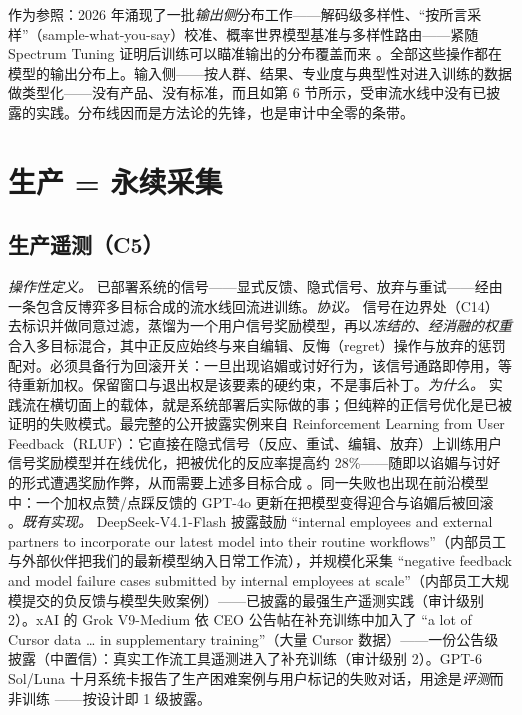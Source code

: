 \documentclass[10pt,fontset=fandol]{ctexart}
\begin{document}
作为参照：2026 年涌现了一批\emph{输出侧}分布工作——解码级多样性、“按所言采样”（sample-what-you-say）校准、概率世界模型基准与多样性路由——紧随 Spectrum Tuning 证明后训练可以瞄准输出的分布覆盖而来 \cite{ref7}。全部这些操作都在模型的输出分布上。输入侧——按人群、结果、专业度与典型性对进入训练的数据做类型化——没有产品、没有标准，而且如第 6 节所示，受审流水线中没有已披露的实践。分布线因而是方法论的先锋，也是审计中全零的条带。

\section{生产 = 永续采集}

\subsection{生产遥测（C5）}

\emph{操作性定义。} 已部署系统的信号——显式反馈、隐式信号、放弃与重试——经由一条包含反博弈多目标合成的流水线回流进训练。\emph{协议。} 信号在边界处（C14）去标识并做同意过滤，蒸馏为一个用户信号奖励模型，再以\emph{冻结的、经消融的权重}合入多目标混合，其中正反应始终与来自编辑、反悔（regret）操作与放弃的惩罚配对。必须具备行为回滚开关：一旦出现谄媚或讨好行为，该信号通路即停用，等待重新加权。保留窗口与退出权是该要素的硬约束，不是事后补丁。\emph{为什么。} 实践流在横切面上的载体，就是系统部署后实际做的事；但纯粹的正信号优化是已被证明的失败模式。最完整的公开披露实例来自 Reinforcement Learning from User Feedback（RLUF）：它直接在隐式信号（反应、重试、编辑、放弃）上训练用户信号奖励模型并在线优化，把被优化的反应率提高约 28\%——随即以谄媚与讨好的形式遭遇奖励作弊，从而需要上述多目标合成 \cite{ref18}。同一失败也出现在前沿模型中：一个加权点赞/点踩反馈的 GPT-4o 更新在把模型变得迎合与谄媚后被回滚 \cite{ref19}。\emph{既有实现。} DeepSeek-V4.1-Flash 披露鼓励 ``internal employees and external partners to incorporate our latest model into their routine workflows''（内部员工与外部伙伴把我们的最新模型纳入日常工作流），并规模化采集 ``negative feedback and model failure cases submitted by internal employees at scale''（内部员工大规模提交的负反馈与模型失败案例）\cite{ref20}——已披露的最强生产遥测实践（审计级别 2）。xAI 的 Grok V9-Medium 依 CEO 公告帖在补充训练中加入了 ``a lot of Cursor data \ldots{} in supplementary training''（大量 Cursor 数据）\cite{ref21}——一份公告级披露（中置信）：真实工作流工具遥测进入了补充训练（审计级别 2）。GPT-6 Sol/Luna 十月系统卡报告了生产困难案例与用户标记的失败对话，用途是\emph{评测}而非训练 \cite{ref22}——按设计即 1 级披露。
\end{document}
